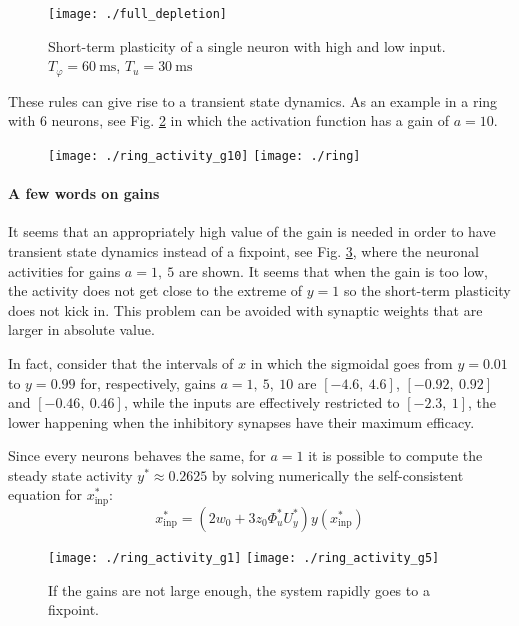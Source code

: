 \documentclass[10pt,a4paper]{article}
\begin{document}
		\begin{figure}
			\centering
			\texttt{[image: ./full\_depletion]}
			\caption{Short-term plasticity of a single neuron with high and low input. $T_\varphi=60 \ \text{ms}$, $T_u = 30 \ \text{ms}$}
			\label{fig:full_depletion}
		\end{figure}
		
		These rules can give rise to a transient state dynamics. As an example in a ring with 6 neurons, see Fig. \ref{fig:ring_activity} in which the activation function has a gain of $a=10$.
		
		\begin{figure}
			\centering

			\texttt{[image: ./ring\_activity\_g10]}
			\texttt{[image: ./ring]}
			\caption{}
			\label{fig:ring_activity}
		\end{figure}
		
		\paragraph{A few words on gains}
		It seems that an appropriately high value of the gain is needed in order to have transient state dynamics instead of a fixpoint, see Fig. \ref{fig:low_gain}, where the neuronal activities for gains $a=1,\ 5$ are shown. It seems that when the gain is too low, the activity does not get close to the extreme of $y = 1$ so the short-term plasticity does not kick in. This problem can be avoided with synaptic weights that are larger in absolute value. 
		
		In fact, consider that the intervals of $x$ in which the sigmoidal goes from $y=0.01$ to $y = 0.99$ for, respectively, gains $a = 1, \ 5, \ 10$ are $\left[-4.6,\ 4.6\right]$, $\left[-0.92,\ 0.92\right]$ and $\left[-0.46,\ 0.46\right]$, while the inputs are effectively restricted to $\left[-2.3,\ 1\right]$, the lower happening when the inhibitory synapses have their maximum efficacy.
		
		Since every neurons behaves the same, for $a=1$ it is possible to compute the steady state activity $y^* \approx 0.2625$ by solving numerically the self-consistent equation for $x_{\text{inp}}^*$:
		\begin{equation}
			x_{\text{inp}}^* = \left(2w_0 + 3 z_0 \varPhi_u^* U_y^* \right) y\left(x_{\text{inp}}^* \right)
		\end{equation}
		
		\begin{figure}
			\texttt{[image: ./ring\_activity\_g1]}
			\texttt{[image: ./ring\_activity\_g5]}
			\caption{If the gains are not large enough, the system rapidly goes to a fixpoint.}
			\label{fig:low_gain}
		\end{figure}
		
\end{document}
